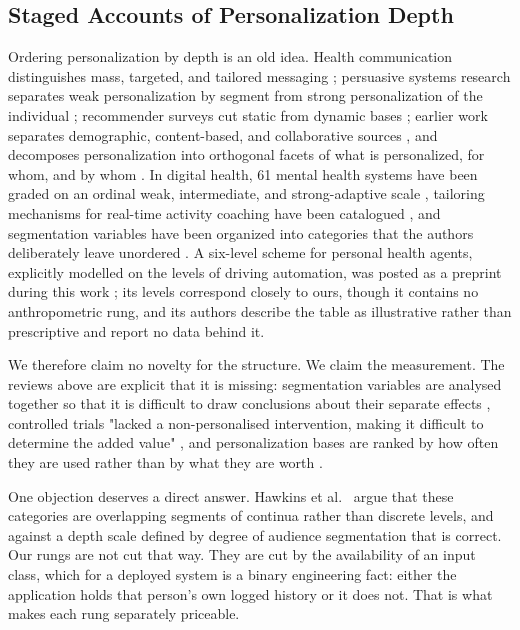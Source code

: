 \documentclass[conference]{IEEEtran}
\begin{document}
\subsection{Staged Accounts of Personalization Depth}
\label{sec:depth}
Ordering personalization by depth is an old idea. Health communication distinguishes mass, targeted, and tailored messaging \cite{kreuter1999onesize, hawkins2008tailoring}; persuasive systems research separates weak personalization by segment from strong personalization of the individual \cite{oinaskukkonen2022truepers}; recommender surveys cut static from dynamic bases \cite{alslaity2023panoramic}; earlier work separates demographic, content-based, and collaborative sources \cite{pazzani1999framework}, and decomposes personalization into orthogonal facets of what is personalized, for whom, and by whom \cite{fanpoole2006personalization}. In digital health, 61 mental health systems have been graded on an ordinal weak, intermediate, and strong-adaptive scale \cite{matthews2025mentalhealth}, tailoring mechanisms for real-time activity coaching have been catalogued \cite{opdenakker2014tailoring}, and segmentation variables have been organized into categories that the authors deliberately leave unordered \cite{tenklooster2024clarifying}. A six-level scheme for personal health agents, explicitly modelled on the levels of driving automation, was posted as a preprint during this work \cite{abbasian2025pcu}; its levels correspond closely to ours, though it contains no anthropometric rung, and its authors describe the table as illustrative rather than prescriptive and report no data behind it.

We therefore claim no novelty for the structure. We claim the measurement. The reviews above are explicit that it is missing: segmentation variables are analysed together so that it is difficult to draw conclusions about their separate effects \cite{tenklooster2024clarifying}, controlled trials "lacked a non-personalised intervention, making it difficult to determine the added value" \cite{matthews2025mentalhealth}, and personalization bases are ranked by how often they are used rather than by what they are worth \cite{alslaity2023panoramic}.

One objection deserves a direct answer. Hawkins et al.\ \cite{hawkins2008tailoring} argue that these categories are overlapping segments of continua rather than discrete levels, and against a depth scale defined by degree of audience segmentation that is correct. Our rungs are not cut that way. They are cut by the availability of an input class, which for a deployed system is a binary engineering fact: either the application holds that person's own logged history or it does not. That is what makes each rung separately priceable.
\end{document}
